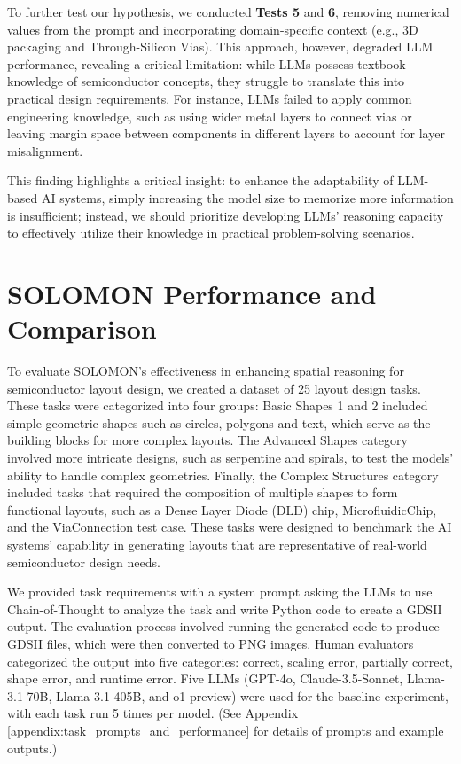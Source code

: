 \documentclass{article}
\begin{document}
To further test our hypothesis, we conducted \textbf{Tests 5} and \textbf{6}, removing numerical values from the prompt and incorporating domain-specific context (e.g., 3D packaging and Through-Silicon Vias). This approach, however, degraded LLM performance, revealing a critical limitation: while LLMs possess textbook knowledge of semiconductor concepts, they struggle to translate this into practical design requirements. For instance, LLMs failed to apply common engineering knowledge, such as using wider metal layers to connect vias or leaving margin space between components in different layers to account for layer misalignment.

This finding highlights a critical insight: to enhance the adaptability of LLM-based AI systems, simply increasing the model size to memorize more information is insufficient; instead, we should prioritize developing LLMs' reasoning capacity to effectively utilize their knowledge in practical problem-solving scenarios.

\section{SOLOMON Performance and Comparison}
\label{sec:evaluation}
To evaluate SOLOMON's effectiveness in enhancing spatial reasoning for semiconductor layout design, we created a dataset of 25 layout design tasks. These tasks were categorized into four groups: Basic Shapes 1 and 2 included simple geometric shapes such as circles, polygons and text, which serve as the building blocks for more complex layouts. The Advanced Shapes category involved more intricate designs, such as serpentine and spirals, to test the models' ability to handle complex geometries. Finally, the Complex Structures category included tasks that required the composition of multiple shapes to form functional layouts, such as a Dense Layer Diode (DLD) chip, MicrofluidicChip, and the ViaConnection test case. These tasks were designed to benchmark the AI systems' capability in generating layouts that are representative of real-world semiconductor design needs.

We provided task requirements with a system prompt asking the LLMs to use Chain-of-Thought to analyze the task and write Python code to create a GDSII output. The evaluation process involved running the generated code to produce GDSII files, which were then converted to PNG images. Human evaluators categorized the output into five categories: correct, scaling error, partially correct, shape error, and runtime error. Five LLMs (GPT-4o, Claude-3.5-Sonnet, Llama-3.1-70B, Llama-3.1-405B, and o1-preview) were used for the baseline experiment, with each task run 5 times per model. (See Appendix \ref{appendix:task_prompts_and_performance} for details of prompts and example outputs.)
\end{document}
